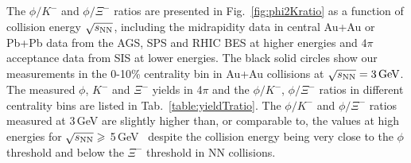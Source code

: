 \documentclass[%
 reprint,	
showpacs,
 amsmath,amssymb,
 aps,
 superscriptaddress,
]{revtex4-1}
\begin{document}
The $\phi/K^-$ and $\phi/\Xi^-$ ratios are presented in Fig.~\ref{fig:phi2Kratio} as a function of collision energy $\sqrt{s_{\rm NN}}$, including the midrapidity data in central Au+Au or Pb+Pb data from the AGS, SPS and RHIC BES at higher energies and $4\pi$\,acceptance data from SIS at lower energies. The black solid circles show our measurements in the 0-10\% centrality bin in Au+Au collisions at ${\sqrt{s_{\rm NN}} = \rm{3\,GeV}}$. The measured $\phi$, $K^-$ and $\Xi^-$ yields in 4$\pi$ and the $\phi/K^-$, $\phi/\Xi^-$ ratios in different centrality bins are listed in Tab.~\ref{table:yieldTratio}. The $\phi/K^-$ and $\phi/\Xi^-$ ratios measured at 3\,GeV are %
slightly higher than, or comparable to, the values at high energies for $\sqrt{s_{\rm NN}}\geqslant$ 5\,GeV~\cite{NA49_phi,NA49_piK,NA49_piK2,NA49_Xi,E917_phi,ALICE_phi_2p7TeV,STAR_phi_64a200GeV,Xi_ArKCl_HADES,star_bes_strangeness} despite the collision energy being very close to the $\phi$ threshold and below the $\Xi^-$ threshold in NN collisions. %
\end{document}
